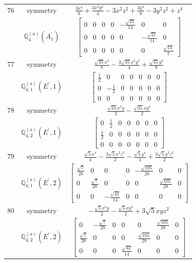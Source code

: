 \documentclass[fleqn,8pt,landscape]{jsarticle}
\begin{document}
\begin{longtable}{ccc}
$ 76 $ & $ \text{symmetry} $ & $ \frac{3 x^{4}}{8} + \frac{3 x^{2} y^{2}}{4} - 3 x^{2} z^{2} + \frac{3 y^{4}}{8} - 3 y^{2} z^{2} + z^{4} $ \\
$  $ & $ \mathbb{Q}_{4}^{(a)}(A_{1}^{\prime}) $ & $ \begin{bmatrix} 0 & 0 & 0 & 0 & - \frac{\sqrt{21}}{14} & 0 & 0 \\ 0 & 0 & 0 & 0 & 0 & - \frac{\sqrt{21}}{14} & 0 \\ 0 & 0 & 0 & 0 & 0 & 0 & \frac{\sqrt{14}}{7} \end{bmatrix} $ \\ \hline
$ 77 $ & $ \text{symmetry} $ & $ \frac{\sqrt{35} x^{4}}{8} - \frac{3 \sqrt{35} x^{2} y^{2}}{4} + \frac{\sqrt{35} y^{4}}{8} $ \\
$  $ & $ \mathbb{Q}_{4,1}^{(a)}(E^{\prime},1) $ & $ \begin{bmatrix} \frac{1}{2} & 0 & 0 & 0 & 0 & 0 & 0 \\ 0 & - \frac{1}{2} & 0 & 0 & 0 & 0 & 0 \\ 0 & 0 & 0 & 0 & 0 & 0 & 0 \end{bmatrix} $ \\ \hline
$ 78 $ & $ \text{symmetry} $ & $ \frac{\sqrt{35} x^{3} y}{2} - \frac{\sqrt{35} x y^{3}}{2} $ \\
$  $ & $ \mathbb{Q}_{4,2}^{(a)}(E^{\prime},1) $ & $ \begin{bmatrix} 0 & \frac{1}{2} & 0 & 0 & 0 & 0 & 0 \\ \frac{1}{2} & 0 & 0 & 0 & 0 & 0 & 0 \\ 0 & 0 & 0 & 0 & 0 & 0 & 0 \end{bmatrix} $ \\ \hline
$ 79 $ & $ \text{symmetry} $ & $ \frac{\sqrt{5} x^{4}}{4} - \frac{3 \sqrt{5} x^{2} z^{2}}{2} - \frac{\sqrt{5} y^{4}}{4} + \frac{3 \sqrt{5} y^{2} z^{2}}{2} $ \\
$  $ & $ \mathbb{Q}_{4,1}^{(a)}(E^{\prime},2) $ & $ \begin{bmatrix} \frac{\sqrt{7}}{28} & 0 & 0 & 0 & - \frac{\sqrt{105}}{28} & 0 & 0 \\ 0 & \frac{\sqrt{7}}{28} & 0 & 0 & 0 & \frac{\sqrt{105}}{28} & 0 \\ 0 & 0 & - \frac{\sqrt{42}}{14} & 0 & 0 & 0 & 0 \end{bmatrix} $ \\ \hline
$ 80 $ & $ \text{symmetry} $ & $ - \frac{\sqrt{5} x^{3} y}{2} - \frac{\sqrt{5} x y^{3}}{2} + 3 \sqrt{5} x y z^{2} $ \\
$  $ & $ \mathbb{Q}_{4,2}^{(a)}(E^{\prime},2) $ & $ \begin{bmatrix} 0 & - \frac{\sqrt{7}}{28} & 0 & 0 & 0 & \frac{\sqrt{105}}{28} & 0 \\ \frac{\sqrt{7}}{28} & 0 & 0 & 0 & \frac{\sqrt{105}}{28} & 0 & 0 \\ 0 & 0 & 0 & \frac{\sqrt{42}}{14} & 0 & 0 & 0 \end{bmatrix} $ \\ \hline

\end{longtable}
\end{document}
